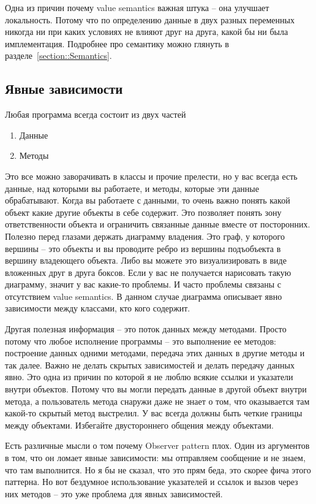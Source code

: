 Одна из причин почему value semantics важная штука -- она улучшает локальность.
Потому что по определению данные в двух разных переменных никогда ни при каких условиях не влияют друг на друга, какой бы ни была имплементация.
Подробнее про семантику можно глянуть в разделе~\ref{section::Semantics}.

\subsection{Явные зависимости}
\label{section::Explicitness}

Любая программа всегда состоит из двух частей
\begin{enumerate}
\item Данные

\item Методы
\end{enumerate}
Это все можно заворачивать в классы и прочие прелести, но у вас всегда есть данные, над которыми вы работаете, и методы, которые эти данные обрабатывают.
Когда вы работаете с данными, то очень важно понять какой объект какие другие объекты в себе содержит.
Это позволяет понять зону ответственности объекта и ограничить связанные данные вместе от посторонних.
Полезно перед глазами держать диаграмму владения.
Это граф, у которого вершины -- это объекты и вы проводите ребро из вершины подъобъекта в вершину владеющего объекта.
Либо вы можете это визуализировать в виде вложенных друг в друга боксов.
Если у вас не получается нарисовать такую диаграмму, значит у вас какие-то проблемы.
И часто проблемы связаны с отсутствием value semantics.
В данном случае диаграмма описывает явно зависимости между классами, кто кого содержит.

Другая полезная информация -- это поток данных между методами.
Просто потому что любое исполнение программы -- это выполнение ее методов: построение данных одними методами, передача этих данных в другие методы и так далее.
Важно не делать скрытых зависимостей и делать передачу данных явно.
Это одна из причин по которой я не люблю всякие ссылки и указатели внутри объектов.
Потому что вы могли передать данные в другой объект внутри метода, а пользователь метода снаружи даже не знает о том, что оказывается там какой-то скрытый метод выстрелил.
У вас всегда должны быть четкие границы между объектами.
Избегайте двустороннего общения между объектами.

Есть различные мысли о том почему Observer pattern плох.
Один из аргументов в том, что он ломает явные зависимости: мы отправляем сообщение и не знаем, что там выполнится.
Но я бы не сказал, что это прям беда, это скорее фича этого паттерна.
Но вот бездумное использование указателей и ссылок и вызов через них методов -- это уже проблема для явных зависимостей.

